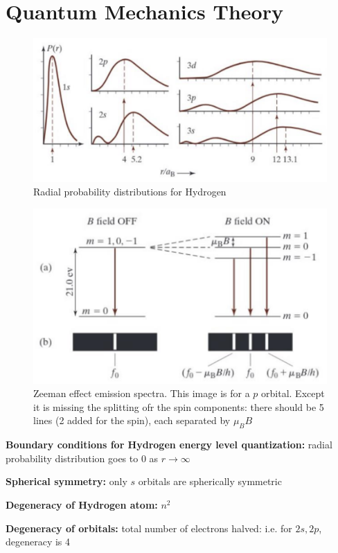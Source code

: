 \documentclass[11pt,fleqn]{book}
\begin{document}
\chapter{Quantum Mechanics Theory}
\begin{figure}[h!]
	\begin{center}
		\includegraphics[width=1\linewidth]{Pictures/radial.png}
	\end{center}
	\caption{Radial probability distributions for Hydrogen
	}
\end{figure}
\begin{figure}[h!]
	\begin{center}
		\includegraphics[width=0.6\linewidth]{Pictures/z.png}
	\end{center}
	\caption{Zeeman effect emission spectra. This image is for a $p$ orbital. Except it is missing the splitting ofr the spin components: there should be 5 lines (2 added for the spin), each separated by $\mu_BB$
	}
\end{figure}

\textbf{Boundary conditions for Hydrogen energy level quantization: }radial probability distribution goes to 0 as $r\rightarrow\infty$

\textbf{Spherical symmetry: }only $s$ orbitals are spherically symmetric

\textbf{Degeneracy of Hydrogen atom: }$n^2$

\textbf{Degeneracy of orbitals: }total number of electrons halved: i.e. for $2s,2p$, degeneracy is 4
\end{document}

